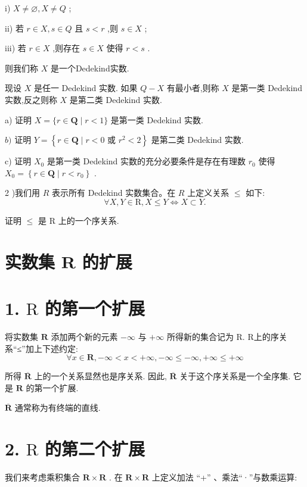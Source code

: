 i) $X \neq  \varnothing ,X \neq  Q$ ;

ii) 若 $r \in  X,s \in  Q$ 且 $s < r$ ,则 $s \in  X$ ;

iii) 若 $r \in  X$ ,则存在 $s \in  X$ 使得 $r < s$ .

则我们称 $X$ 是一个Dedekind实数.

现设 $X$ 是任一 Dedekind 实数. 如果 $Q - X$ 有最小者,则称 $X$ 是第一类 Dedekind实数,反之则称 $X$ 是第二类 Dedekind 实数.

a) 证明 $X = \{ r \in  \mathbf{Q} \mid  r < 1\}$ 是第一类 Dedekind 实数.

$b)$ 证明 $Y = \left\{  {r \in  \mathbf{Q} \mid  r < 0\text{ 或 }{r}^{2} < 2}\right\}$ 是第二类 Dedekind 实数.

c) 证明 ${X}_{0}$ 是第一类 Dedekind 实数的充分必要条件是存在有理数 ${r}_{0}$ 使得 ${X}_{0} = \left\{  {r \in  \mathbf{Q} \mid  r < {r}_{0}}\right\}$ .

2 )我们用 $R$ 表示所有 Dedekind 实数集合。在 $R$ 上定义关系 $\leq$ 如下:
$$\forall X,Y \in  \mathrm{R},X \leq  Y \Leftrightarrow  X \subset  Y.$$

证明 $\leq$ 是 $\mathrm{R}$ 上的一个序关系.

\section{实数集 $\mathbf{R}$ 的扩展}

\section*{1. $\mathrm{R}$ 的第一个扩展}

将实数集 $\mathbf{R}$ 添加两个新的元素 $- \infty$ 与 $+ \infty$ 所得新的集合记为 R. R上的序关系“≤”加上下述约定:
$$\forall x \in  \mathbf{R}, - \infty  < x <  + \infty , - \infty  \leq   - \infty , + \infty  \leq   + \infty$$

所得 $\overline{\mathbf{R}}$ 上的一个关系显然也是序关系. 因此, $\overline{\mathbf{R}}$ 关于这个序关系是一个全序集. 它是 $\mathbf{R}$ 的第一个扩展.

$\overline{\mathbf{R}}$ 通常称为有终端的直线.

\section*{2. $\mathrm{R}$ 的第二个扩展}

我们来考虑乘积集合 $\mathbf{R} \times  \mathbf{R}$ . 在 $\mathbf{R} \times  \mathbf{R}$ 上定义加法 “+” 、乘法“·”与数乘运算:

